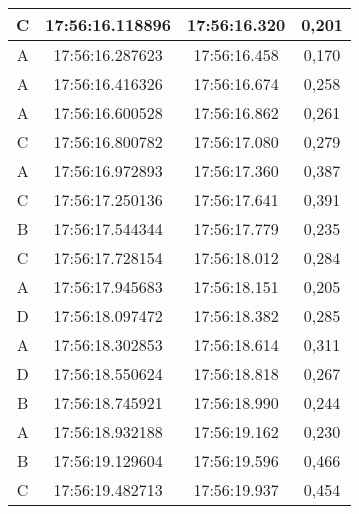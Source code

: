 \begin{table}[!h]
\begin{tabular}{|ccc|c|}
  \multicolumn{1}{|c|}{C}    & \multicolumn{1}{c|}{17:56:16.118896} & 17:56:16.320       & 0,201        \\ \hline
  \multicolumn{1}{|c|}{A}    & \multicolumn{1}{c|}{17:56:16.287623} & 17:56:16.458       & 0,170        \\ \hline
  \multicolumn{1}{|c|}{A}    & \multicolumn{1}{c|}{17:56:16.416326} & 17:56:16.674       & 0,258        \\ \hline
  \multicolumn{1}{|c|}{A}    & \multicolumn{1}{c|}{17:56:16.600528} & 17:56:16.862       & 0,261        \\ \hline
  \multicolumn{1}{|c|}{C}    & \multicolumn{1}{c|}{17:56:16.800782} & 17:56:17.080       & 0,279        \\ \hline
  \multicolumn{1}{|c|}{A}    & \multicolumn{1}{c|}{17:56:16.972893} & 17:56:17.360       & 0,387        \\ \hline
  \multicolumn{1}{|c|}{C}    & \multicolumn{1}{c|}{17:56:17.250136} & 17:56:17.641       & 0,391        \\ \hline
  \multicolumn{1}{|c|}{B}    & \multicolumn{1}{c|}{17:56:17.544344} & 17:56:17.779       & 0,235        \\ \hline
  \multicolumn{1}{|c|}{C}    & \multicolumn{1}{c|}{17:56:17.728154} & 17:56:18.012       & 0,284        \\ \hline
  \multicolumn{1}{|c|}{A}    & \multicolumn{1}{c|}{17:56:17.945683} & 17:56:18.151       & 0,205        \\ \hline
  \multicolumn{1}{|c|}{D}    & \multicolumn{1}{c|}{17:56:18.097472} & 17:56:18.382       & 0,285        \\ \hline
  \multicolumn{1}{|c|}{A}    & \multicolumn{1}{c|}{17:56:18.302853} & 17:56:18.614       & 0,311        \\ \hline
  \multicolumn{1}{|c|}{D}    & \multicolumn{1}{c|}{17:56:18.550624} & 17:56:18.818       & 0,267        \\ \hline
  \multicolumn{1}{|c|}{B}    & \multicolumn{1}{c|}{17:56:18.745921} & 17:56:18.990       & 0,244        \\ \hline
  \multicolumn{1}{|c|}{A}    & \multicolumn{1}{c|}{17:56:18.932188} & 17:56:19.162       & 0,230        \\ \hline
  \multicolumn{1}{|c|}{B}    & \multicolumn{1}{c|}{17:56:19.129604} & 17:56:19.596       & 0,466        \\ \hline
  \multicolumn{1}{|c|}{C}    & \multicolumn{1}{c|}{17:56:19.482713} & 17:56:19.937       & 0,454        \\ \hline

\end{tabular}
\end{table}
